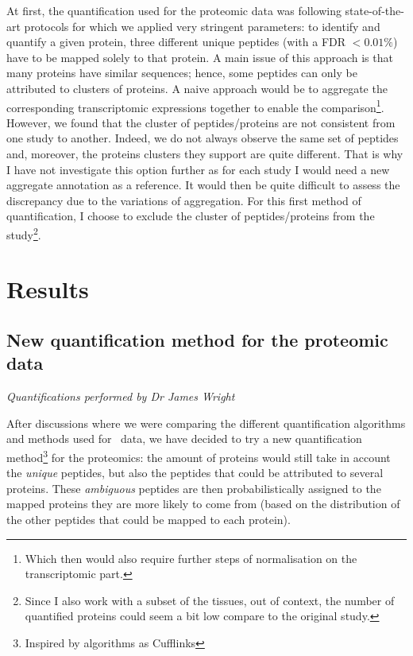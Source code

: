 At first, the quantification used for the proteomic data was following
state-of-the-art protocols for which we applied very stringent parameters:
to identify and quantify a given protein, three different unique peptides
(with a \gls{FDR} $< 0.01 \%$) have to be mapped solely to that protein. A main
issue of this approach is that many proteins have similar sequences; hence, some
peptides can only be attributed to clusters of proteins. A naive approach would
be to aggregate the corresponding transcriptomic expressions together to enable
the comparison\footnote{Which then would also require further steps of
normalisation on the transcriptomic part.}. However, we found that the cluster
of peptides/proteins are not consistent from one study to another. Indeed, we do
not always observe the same set of peptides and, moreover, the proteins clusters
they support are quite different. That is why I have not investigate this option
further as for each study I would need a new aggregate annotation as a reference.
It would then be quite difficult to assess the discrepancy due to the
variations of aggregation. For this first method of quantification, I choose to
exclude the cluster of peptides/proteins from the study\footnote{Since I also work
with a subset of the tissues, out of context, the number of quantified proteins
could seem a bit low compare to the original study.}.


\section{Results}
\label{sec:IntegrationResults}

\subsection{New quantification method for the proteomic data}
\label{subsec:IntegrationNewMethQuant}

\textit{Quantifications performed by Dr James Wright}

After discussions where we were comparing the different quantification algorithms
and methods used for \Rnaseq\ data, we have decided to try a new quantification
method\footnote{Inspired by algorithms as Cufflinks} for the proteomics:
the amount of proteins would still take in account the \emph{unique} peptides,
but also the peptides that could be attributed to several proteins.
These \emph{ambiguous} peptides are then probabilistically assigned to the
mapped proteins they are more likely to come from (based on the distribution of
the other peptides that could be mapped to each protein).

